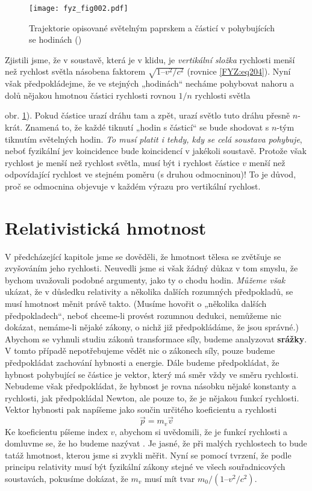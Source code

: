 {    \begin{figure}[ht!]  %
      \centering
      \texttt{[image: fyz\_fig002.pdf]}
      \caption{Trajektorie opisované světelným paprskem a částicí v pohybujících se hodinách
               (\cite[s.~231]{Feynman01})}
      \label{fyz:fig002}
    \end{figure}
    Zjistili jsme, že v soustavě, která je v klidu, je \emph{vertikální složka} rychlosti menší než 
    rychlost světla násobena faktorem \(\sqrt{1 – v^2/c^2}\) (rovnice \ref{FYZ:eq204}). Nyní však 
    předpokládejme, že ve stejných „hodinách“ necháme pohybovat nahoru a dolů nějakou hmotnou 
    částici rychlosti rovnou \(1 /n\) rychlosti světla {obr. \ref{fyz:fig002}). Pokud částice urazí 
    dráhu tam a zpět, urazí světlo tuto dráhu přesně \(n\)-krát. Znamená to, že každé tiknutí 
    „hodin s částicí“ se bude shodovat s \(n\)-tým tiknutím světelných hodin. \emph{To musí platit 
    i tehdy, kdy se celá soustava pohybuje}, neboť fyzikální jev koincidence bude koincidencí v 
    jakékoli soustavě. Protože však rychlost je menší než rychlost světla, musí být i rychlost 
    částice \(v\) menší než odpovídající rychlost ve stejném poměru (s druhou odmocninou)! To je 
    důvod, proč se odmocnina objevuje v každém výrazu pro vertikální rychlost.
    
  \section{Relativistická hmotnost}\label{fyz:IchapXVIsecIV}
    V předcházející kapitole jsme se dověděli, že hmotnost tělesa se zvětšuje se zvyšováním jeho 
    rychlosti. Neuvedli jsme si však žádný důkaz v tom smyslu, že bychom uvažovali podobné 
    argumenty, jako ty o chodu hodin. \emph{Můžeme však} ukázat, že v důsledku relativity a 
    několika dalších rozumných předpokladů, se musí hmotnost měnit právě takto. (Musíme hovořit o 
    „několika dalších předpokladech“, neboť chceme-li provést rozumnou dedukci, nemůžeme nic 
    dokázat, nemáme-li nějaké zákony, o nichž již předpokládáme, že jsou správné.) Abychom se 
    vyhnuli studiu zákonů transformace síly, budeme analyzovat \textbf{srážky}. V tomto případě 
    nepotřebujeme vědět nic o zákonech síly, pouze budeme předpokládat zachování hybnosti a 
    energie. Dále budeme předpokládat, že hybnost pohybující se částice je vektor, který má směr 
    vždy ve směru rychlosti. Nebudeme však předpokládat, že hybnost je rovna násobku nějaké 
    konstanty a rychlosti, jak předpokládal Newton, ale pouze to, že je nějakou funkcí rychlosti. 
    Vektor hybnosti pak napíšeme jako součin určitého koeficientu a rychlosti
    \begin{equation}\label{FYZ:eq211}
      \vec{p} = m_v\vec{v}
    \end{equation}
    Ke koeficientu píšeme index \(v\), abychom si uvědomili, že je funkcí rychlosti a domluvme se, 
    že ho budeme nazývat . Je jasné, že při malých rychlostech to bude tatáž 
    hmotnost, kterou jsme si zvykli měřit. Nyní se pomocí tvrzení, že podle principu relativity 
    musí být fyzikální zákony stejné ve všech souřadnicových soustavách, pokusíme dokázat, že 
    \(m_v\) musí mít tvar \(m_0/(1 – v^2/c^2)\).
    
}}
